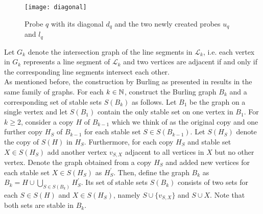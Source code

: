 \begin{figure}[ht]
\begin{center}
\texttt{[image: diagonal]}
\end{center}
\caption{Probe $q$ with its diagonal $d_q$ and the two newly created probes $u_q$ and $l_q$}
\label{f2ls}
\end{figure}


Let $G_k$ denote the intersection graph of the line segments in $\mathcal{L}_k$, i.e. each vertex in $G_k$ represents a line segment of $\mathcal{L}_k$ and two vertices are adjacent if and only if the corresponding line segments intersect each other.\\

As mentioned before, the construction by Burling as presented in \cite{Fe18} results in the same family of graphs. For each $k\in\mathbb{N}$, construct the Burling graph $B_k$ and a corresponding set of stable sets $S(B_k)$ as follows. Let $B_1$ be the graph on a single vertex and let $S(B_1)$ contain the only stable set on one vertex in $B_1$. For $k\geq 2$, consider a copy $H$ of $B_{k-1}$ which we think of as the original copy and one further copy $H_S$ of $B_{k-1}$ for each stable set $S\in S(B_{k-1})$. Let $S(H_S)$ denote the copy of $S(H)$ in $H_S$. Furthermore, for each copy $H_S$ and stable set $X\in S(H_S)$ add another vertex $v_{S,X}$ adjacent to all vertices in $X$ but no other vertex. Denote the graph obtained from a copy $H_S$ and added new vertices for each stable set $X\in S(H_S)$ as $H_S^{\prime}$. Then, define the graph $B_k$ as $B_k=H\cup\bigcup_{S\in S(B_k)} H_S^{\prime}$. Its set of stable sets $S(B_k)$ consists of two sets for each $S\in S(H)$ and $X\in S(H_S)$, namely $S\cup \lbrace v_{S,X}\rbrace$ and $S\cup X$. Note that both sets are stable in $B_k$.

